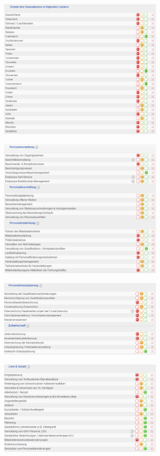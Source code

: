 \documentclass[12pt]{article}
\begin{document}
\noindent
\begin{figure}[!h]
\centering
\includegraphics[width=0.7\textwidth]{images/tr4}
\end{figure}\FloatBarrier
\noindent
\begin{figure}[!h]
\centering
\includegraphics[width=0.7\textwidth]{images/tr5}
\end{figure}\FloatBarrier
\noindent
\begin{figure}[!h]
\centering
\includegraphics[width=0.7\textwidth]{images/tr6}
\end{figure}\FloatBarrier
\noindent
\begin{figure}[!h]
\centering
\includegraphics[width=0.7\textwidth]{images/tr7}
\end{figure}\FloatBarrier
\end{document}
